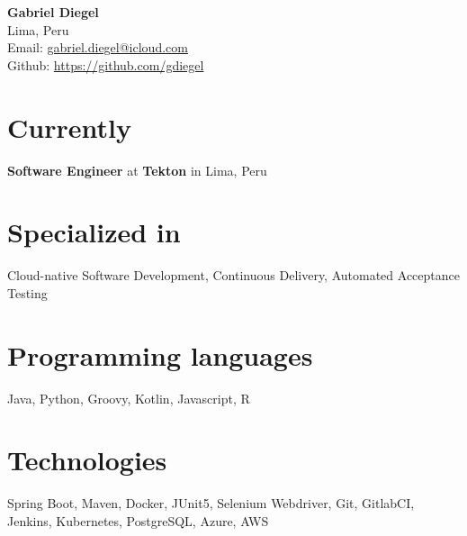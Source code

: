 \documentclass[9pt, a4paper]{extarticle}
\begin{document}
{\bf \LARGE Gabriel Diegel}\\[0.1cm]
Lima, Peru\\[0.1cm]
Email: \href{mailto:gabriel.diegel@icloud.com}{gabriel.diegel@icloud.com}\\[0.1cm]
Github: \href{https://github.com/gdiegel}{https://github.com/gdiegel}\\

\section*{Currently}
{\bf Software Engineer} at {\bf Tekton} in Lima, Peru

\section*{Specialized in}
Cloud-native Software Development, Continuous Delivery, Automated Acceptance Testing

\section*{Programming languages}
Java, Python, Groovy, Kotlin, Javascript, R

\section*{Technologies}
Spring Boot, Maven, Docker, JUnit5, Selenium Webdriver, Git, GitlabCI, Jenkins, Kubernetes, PostgreSQL, Azure, AWS
\end{document}
